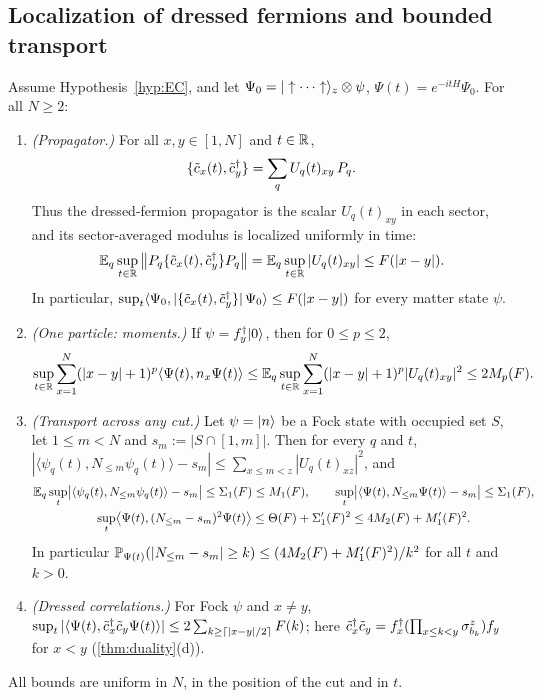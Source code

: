 \subsection{Localization of dressed fermions and bounded transport}\label{sec:main:transport}

\begin{theorem}\label{thm:transport}
Assume Hypothesis~\ref{hyp:EC}, and let $\Psi_0=|\uparrow\cdots\uparrow\rangle_z\otimes\psi$,
$\Psi(t)=e^{-itH}\Psi_0$.  For all $N\ge2$:
\begin{enumerate}[label=(\alph*)]
\item \emph{(Propagator.)}  For all $x,y\in[1,N]$ and $t\in\mathbb{R}$,
\begin{equation}\label{eq:main-anticomm}
  \{\tilde c_x(t),\tilde c_y^\dagger\}=\sum_qU_q(t)_{xy}\,P_q .
\end{equation}
Thus the dressed-fermion propagator is the scalar $U_q(t)_{xy}$ in each sector, and its sector-averaged
modulus is localized uniformly in time:
\begin{equation}\label{eq:main-prop}
  \mathbb{E}_q\sup_{t\in\mathbb{R}}\left\|P_q\{\tilde c_x(t),\tilde c_y^\dagger\}P_q\right\|=\mathbb{E}_q\sup_{t\in\mathbb{R}}|U_q(t)_{xy}|\le F(|x-y|).
\end{equation}
In particular, $\sup_t\langle\Psi_0,|\{\tilde c_x(t),\tilde c_y^\dagger\}|\,\Psi_0\rangle\le F(|x-y|)$ for every
matter state $\psi$.
\item \emph{(One particle: moments.)}  If $\psi=f_y^\dagger|0\rangle$, then for $0\le p\le2$,
\[
  \sup_{t\in\mathbb{R}}\sum_{x=1}^N(|x-y|+1)^p\langle\Psi(t),n_x\Psi(t)\rangle
  \le\mathbb{E}_q\sup_{t\in\mathbb{R}}\sum_{x=1}^N(|x-y|+1)^p|U_q(t)_{xy}|^2\le2M_p(F).
\]
\item \emph{(Transport across any cut.)}  Let $\psi=|n\rangle$ be a Fock state with occupied set $S$, let
$1\le m<N$ and $s_m:=|S\cap[1,m]|$.  Then for every $q$ and $t$,
$|\langle\psi_q(t),N_{\le m}\psi_q(t)\rangle-s_m|\le\sum_{x\le m<z}|U_q(t)_{xz}|^2$, and
\begin{gather}
  \mathbb{E}_q\sup_t\bigl|\langle\psi_q(t),N_{\le m}\psi_q(t)\rangle-s_m\bigr|\le\Sigma_1(F)\le M_1(F),\qquad
  \sup_t\bigl|\langle\Psi(t),N_{\le m}\Psi(t)\rangle-s_m\bigr|\le\Sigma_1(F),\label{eq:main-transport}\\
  \sup_t\bigl\langle\Psi(t),(N_{\le m}-s_m)^2\Psi(t)\bigr\rangle\le\Theta(F)+\Sigma_1'(F)^2\le4M_2(F)+M'_1(F)^2.
  \label{eq:main-transport2}
\end{gather}
In particular $\mathbb{P}_{\Psi(t)}(|N_{\le m}-s_m|\ge k)\le(4M_2(F)+M'_1(F)^2)/k^2$ for all $t$ and $k>0$.
\item \emph{(Dressed correlations.)}  For Fock $\psi$ and $x\neq y$,
$\sup_t|\langle\Psi(t),\tilde c_x^\dagger\tilde c_y\Psi(t)\rangle|\le2\sum_{k\ge\lceil|x-y|/2\rceil}F(k)$; here
$\tilde c_x^\dagger\tilde c_y=f_x^\dagger(\prod_{x\le k<y}\sigma^z_{b_k})f_y$ for $x<y$ (\cref{thm:duality}(d)).
\end{enumerate}
All bounds are uniform in $N$, in the position of the cut and in $t$.
\end{theorem}

